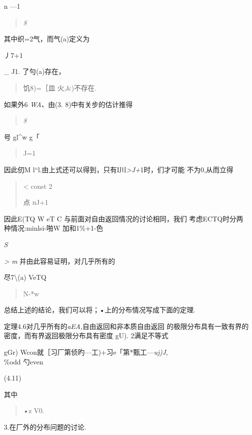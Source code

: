 n ---1

\begin{quote}
\emph{8}
\end{quote}

其中织=2气，而气(a)定义为

丿7+1

\_ J1. 了勻(a)存在，

\begin{quote}
饥8)=［皿 火,\&)不存在.
\end{quote}

如果外6 \emph{WA、}由(3. 8)中有关步的估计推得

\begin{quote}
\emph{8}
\end{quote}

号 gl\^{}w g\textbar{}「

\begin{quote}
J=1
\end{quote}

因此仞M
l``l.由上式还可以得到，只有I川\emph{\textgreater{}J+}1时，们才可能
不为0,从而立得

\begin{quote}
\textless{} const 2

点 \textsc{hJ+1}
\end{quote}

因此E(TQ W eT C 与前面对自由返回情况的讨论相同，我们
考虑ECTQ时分两种情况:minlsi-啪W 加和1\%+1-色\textbar{}

\emph{S}

\emph{\textgreater{} m} 并由此容易证明，对几乎所有的

尽7\textbackslash{}(a) VeTQ

\begin{quote}
N-*w
\end{quote}

总结上述的结论，我们可以将；•上的分布情况写成下面的定理.

定理4.6对几乎所有的\emph{aEA,}自由返回和非本质自由返回
的极限分布具有一致有界的密度，而有界返回极限分布具有密度 gU).
2满足不等式

gGr) Wcon就［习厂第侦旳---工)+习e「第*甄工---\emph{uj)J,\\
}\%odd 勺even

(4.11)

其中

\begin{quote}
•z V0.
\end{quote}

3.在厂外的分布问题的讨论.

